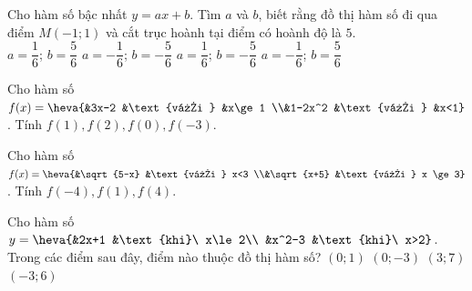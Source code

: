 \begin{ex}%
	Cho hàm số bậc nhất $y=ax+b$. Tìm $a$  và $b$, biết rằng đồ thị hàm số đi qua điểm $M(-1;1)$ và cắt trục hoành tại điểm có hoành độ là $5$.\\
	\choice 
		{$a=\dfrac{1}{6}$; $b=\dfrac{5}{6}$} 
		{$a=-\dfrac{1}{6}$; $b=-\dfrac{5}{6}$} 
		{$a=\dfrac{1}{6}$; $b=-\dfrac{5}{6}$} 
		{\True  $a=-\dfrac{1}{6}$; $b=\dfrac{5}{6}$}
\end{ex}

\begin{bt}%
	Cho hàm số $f(x)=\heva{&3x-2 &\text{với } &x\ge 1 \\&1-2x^2 &\text{với } &x<1}$. Tính $f(1), f(2), f(0), f(-3)$.
\end{bt}

\begin{bt}%
	Cho hàm số $f(x)=\heva{&\sqrt{5-x} &\text{với } x<3 \\&\sqrt{x+5} &\text{với } x \ge 3}$. Tính $f(-4), f(1), f(4)$.
\end{bt}

\begin{ex}%
	Cho hàm số $y=\heva{&2x+1 &\text{khi}\ x\le 2\\ &x^2-3 &\text{khi}\ x>2}$. Trong các điểm sau đây, điểm  nào thuộc đồ thị hàm số?
	 \choice
		{\True  $(0;1)$}
		{$(0;-3)$} 
		{$(3;7)$} 
		 {$(-3;6)$}
\end{ex}

